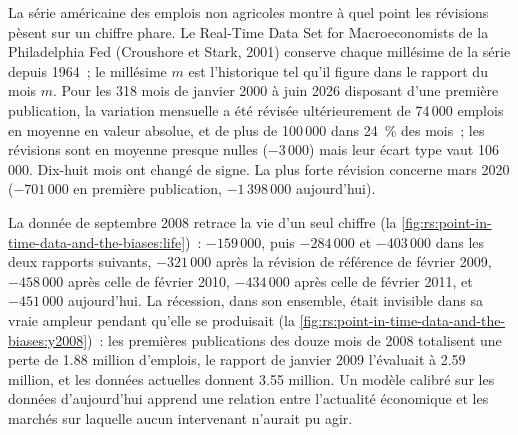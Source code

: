 La série américaine des emplois non agricoles montre à quel point les révisions pèsent sur un chiffre phare. Le Real-Time Data Set for
Macroeconomists de la Philadelphia Fed (Croushore et Stark, 2001) conserve chaque millésime de la série depuis 1964~; le millésime $m$ est l'historique
tel qu'il figure dans le rapport du mois $m$. Pour les 318 mois de janvier 2000 à juin 2026 disposant d'une première publication, la variation mensuelle
a été révisée ultérieurement de 74\,000 emplois en moyenne en valeur absolue, et de plus de 100\,000 dans 24~\% des mois~; les
révisions sont en moyenne presque nulles ($-3\,000$) mais leur écart type vaut 106\,000. Dix-huit mois ont changé de signe. La plus forte
révision concerne mars 2020 ($-701\,000$ en première publication, $-1\,398\,000$ aujourd'hui).

La donnée de septembre 2008 retrace la vie d'un seul chiffre (la \cref{fig:rs:point-in-time-data-and-the-biases:life})~: $-159\,000$,
puis $-284\,000$ et $-403\,000$ dans les deux rapports suivants, $-321\,000$ après la révision de référence de février 2009, $-458\,000$
après celle de février 2010, $-434\,000$ après celle de février 2011, et $-451\,000$ aujourd'hui. La récession, dans son ensemble, était invisible dans sa
vraie ampleur pendant qu'elle se produisait (la \cref{fig:rs:point-in-time-data-and-the-biases:y2008})~: les premières publications des douze mois de 2008
totalisent une perte de 1.88 million d'emplois, le rapport de janvier 2009 l'évaluait à 2.59 million, et les données actuelles donnent 3.55 million.
Un modèle calibré sur les données d'aujourd'hui apprend une relation entre l'actualité économique et les marchés sur laquelle aucun intervenant n'aurait pu agir.

\begin{omfigure}

\label{fig:rs:point-in-time-data-and-the-biases:life}
\end{omfigure}


